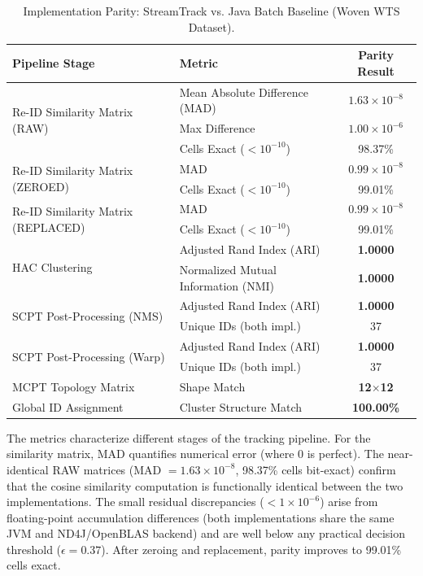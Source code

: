 \documentclass[review]{elsarticle}
\begin{document}
\begin{table}[H]
    \centering
    \caption{Implementation Parity: StreamTrack vs. Java Batch Baseline (Woven WTS Dataset).}
    \label{tab:parity_metrics}
    \begin{tabular}{@{}llc@{}}
        \toprule
        \textbf{Pipeline Stage} & \textbf{Metric} & \textbf{Parity Result} \\ \midrule
        \multirow{3}{*}{Re-ID Similarity Matrix (RAW)}
            & Mean Absolute Difference (MAD) & $1.63 \times 10^{-8}$ \\
            & Max Difference & $1.00 \times 10^{-6}$ \\
            & Cells Exact ($<10^{-10}$) & 98.37\% \\ \cline{2-3}
        \multirow{2}{*}{Re-ID Similarity Matrix (ZEROED)}
            & MAD & $0.99 \times 10^{-8}$ \\
            & Cells Exact ($<10^{-10}$) & 99.01\% \\ \cline{2-3}
        \multirow{2}{*}{Re-ID Similarity Matrix (REPLACED)}
            & MAD & $0.99 \times 10^{-8}$ \\
            & Cells Exact ($<10^{-10}$) & 99.01\% \\ \hline
        \multirow{2}{*}{HAC Clustering}
            & Adjusted Rand Index (ARI) & \textbf{1.0000} \\
            & Normalized Mutual Information (NMI) & \textbf{1.0000} \\ \hline
        \multirow{2}{*}{SCPT Post-Processing (NMS)}
            & Adjusted Rand Index (ARI) & \textbf{1.0000} \\
            & Unique IDs (both impl.) & 37 \\ \cline{2-3}
        \multirow{2}{*}{SCPT Post-Processing (Warp)}
            & Adjusted Rand Index (ARI) & \textbf{1.0000} \\
            & Unique IDs (both impl.) & 37 \\ \hline
        MCPT Topology Matrix & Shape Match & \textbf{12$\times$12} \\ \hline
        Global ID Assignment & Cluster Structure Match & \textbf{100.00\%} \\ \bottomrule
    \end{tabular}
\end{table}

The metrics characterize different stages of the tracking pipeline. For the similarity matrix, MAD quantifies numerical error (where $0$ is perfect). The near-identical RAW matrices (MAD $= 1.63 \times 10^{-8}$, 98.37\% cells bit-exact) confirm that the cosine similarity computation is functionally identical between the two implementations. The small residual discrepancies ($< 1 \times 10^{-6}$) arise from floating-point accumulation differences (both implementations share the same JVM and ND4J/OpenBLAS backend) and are well below any practical decision threshold ($\epsilon = 0.37$). After zeroing and replacement, parity improves to 99.01\% cells exact.
\end{document}
